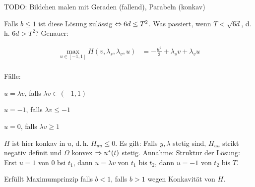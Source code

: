 TODO: Bildchen malen mit Geraden (fallend), Parabeln (konkav)

Falls $b \leq 1$ ist diese Lösung zulässig $\Leftrightarrow 6d \leq T^2$. Was passiert, wenn $T < \sqrt{6d}$, d.\,h. $6d > T^2$? Genauer: 

\begin{align*}
\max_{u\in [-1,1]} H(v, \lambda_s, \lambda_v, u) &= - \frac{u^2}2 + \lambda_s v + \lambda_v u \\
\end{align*}

Fälle:

\bitm
\item $u = \lambda v$, falls $\lambda v \in (-1,1)$
\item $u = -1$, falls $\lambda v \leq -1$
\item $u = 0$, falls $\lambda v \geq 1$
\eitm 

$H$ ist hier konkav in $u$, d.\,h. $H_{uu} \leq 0$. Es gilt: Falls $y, \lambda$ stetig sind, $H_{uu}$ strikt negativ definit und $\Omega$ konvex $\Rightarrow u^*(t)$ stetig. Annahme: Struktur der Lösung:
Erst $u=1$ von $0$ bsi $t_1$, dann $u = \lambda v$ von $t_1$ bis $t_2$, dann $u = -1$ von $t_2$ bis $T$.

Erfüllt Maximumprinzip falls $b < 1$, falls $b>1$ wegen Konkavität von $H$.






























